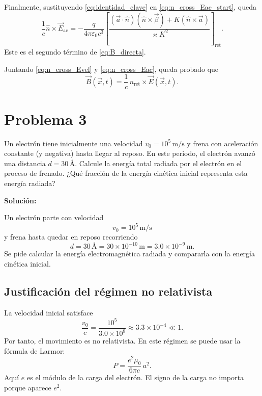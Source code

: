 \documentclass{article}
\numberwithin{equation}{section}
\newcommand{\eps}{\varepsilon_0}
\newcommand{\bv}{\vec{\beta}}
\newcommand{\av}{\vec{a}}
\newcommand{\nh}{\hat{n}}
\newcommand{\K}{K}
\begin{document}
Finalmente, sustituyendo \eqref{eq:identidad_clave} en
\eqref{eq:n_cross_Eac_start}, queda
\begin{equation}
  \boxed{
  \frac{1}{c}\nh\times\vec{E}_{\mathrm{ac}}
  =-\frac{q}{4\pi\eps c^3}
  \left[
  \frac{(\av\cdot\nh)(\nh\times\bv)+\K(\nh\times\av)}{\varkappa\K^2}
  \right]_{\mathrm{ret}}.
  }
  \label{eq:n_cross_Eac}
\end{equation}
Este es el segundo t\'ermino de \eqref{eq:B_directa}.

Juntando \eqref{eq:n_cross_Evel} y \eqref{eq:n_cross_Eac}, queda probado que
\begin{equation*}
  \boxed{
  \vec{B}(\vec{x},t)
  =\frac{1}{c}\,\nh_{\mathrm{ret}}\times\vec{E}(\vec{x},t).
  }
\end{equation*}

\newpage

\newpage
\section{Problema 3}
Un electrón tiene inicialmente una velocidad $v_0=10^5\,\mathrm{m/s}$ y frena con aceleración constante (y negativa) hasta llegar al reposo. En este periodo, el electrón avanzó una distancia $d=30\,\text{\AA}$. Calcule la energía total radiada por el electrón en el proceso de frenado. ¿Qué fracción de la energía cinética inicial representa esta energía radiada?

\textbf{Solución:}

Un electr\'on parte con velocidad
\begin{equation*}
  v_0=10^5\,\mathrm{m/s}
\end{equation*}
y frena hasta quedar en reposo recorriendo
\begin{equation*}
  d=30\,\text{\AA}=30\times10^{-10}\,\mathrm{m}=3.0\times10^{-9}\,\mathrm{m}.
\end{equation*}
Se pide calcular la energ\'ia electromagn\'etica radiada y compararla con la
energ\'ia cin\'etica inicial.

\subsection{Justificaci\'on del r\'egimen no relativista}

La velocidad inicial satisface
\begin{equation*}
  \frac{v_0}{c}
  =\frac{10^5}{3.0\times10^8}
  \approx3.3\times10^{-4}\ll1.
\end{equation*}
Por tanto, el movimiento es no relativista. En este r\'egimen se puede usar
la f\'ormula de Larmor:
\begin{equation}
  \boxed{
  P=\frac{e^2\mu_0}{6\pi c}\,a^2.
  }
  \label{eq:larmor}
\end{equation}
Aqu\'i $e$ es el m\'odulo de la carga del electr\'on. El signo de la carga no
importa porque aparece $e^2$.
\end{document}
